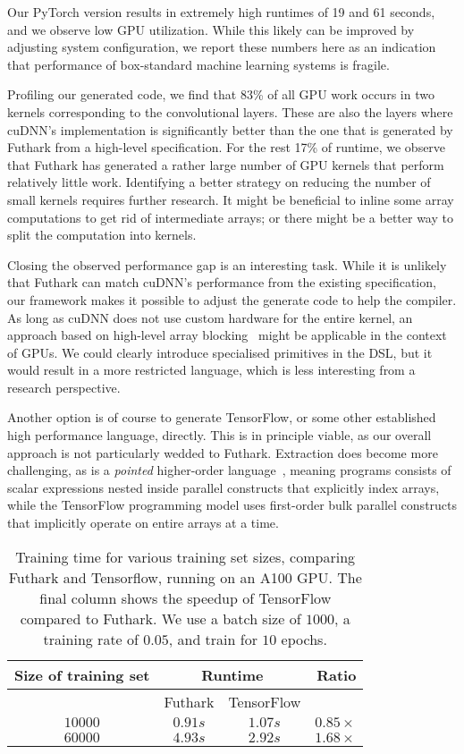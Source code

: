 Our PyTorch version results in extremely high runtimes of 19 and 61
seconds, and we observe low GPU utilization. While this likely can be
improved by adjusting system configuration, we report these numbers here
as an indication that performance of box-standard machine learning systems is
fragile.

Profiling our generated code, we find that 83\% of all GPU work occurs
in two kernels corresponding to the convolutional layers. These are also the layers
where cuDNN's implementation is significantly better than the one
that is generated by Futhark from a high-level specification.
For the rest 17\% of runtime, we observe that Futhark has
generated a rather large number of GPU kernels that perform relatively
little work.  Identifying a better strategy on reducing the number
of small kernels requires further research.  It might be beneficial to
inline some array computations to get rid of intermediate arrays;
or there might be a better way to split the computation into kernels.

Closing the observed performance gap is an interesting task.
While it is unlikely that Futhark can match cuDNN's performance
from the existing specification, our framework makes it possible
to adjust the generate code to help the compiler.  As long as cuDNN
does not use custom hardware for the entire kernel, an approach
based on high-level array blocking~\cite{rp-mm} might be applicable
in the context of GPUs.  We could clearly introduce specialised
primitives in the DSL, but it would result in a more
restricted language, which is less interesting from a research
perspective.

Another option is of course to generate TensorFlow, or some other established
high performance language, directly. This is in principle viable, as our overall
approach is not particularly wedded to Futhark. Extraction does become more
challenging, as  is a \emph{pointed} higher-order
language~\cite{10.1145/3473593}, meaning programs consists of scalar expressions
nested inside parallel constructs that explicitly index arrays, while the
TensorFlow programming model uses first-order bulk parallel constructs that
implicitly operate on entire arrays at a time.

\begin{table}
\caption{Training time for various training set sizes, comparing
  Futhark and Tensorflow, running on an A100 GPU. The final column
  shows the speedup of TensorFlow compared to Futhark. We use a batch
  size of $1000$, a training rate of $0.05$, and train for $10$
  epochs.}
\begin{tabular}{cccr}
\toprule
\textbf{Size of training set} & \multicolumn{2}{c}{\textbf{Runtime}} & \textbf{Ratio} \\
\midrule
& Futhark & TensorFlow & \\
$10000$ & $0.91s$ & $1.07s$ &  $0.85\times{}$ \\
$60000$ & $4.93s$ & $2.92s$ &  $1.68\times{}$ \\
\bottomrule
\end{tabular}
\label{tab:performance}
\end{table}

%
